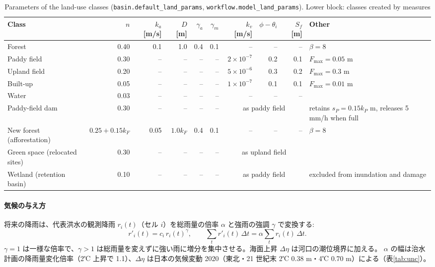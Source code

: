 \documentclass[a4paper,10pt]{ltjsarticle}
\begin{document}
\begin{table}[tbp]
\centering\footnotesize\setlength{\tabcolsep}{3pt}
\caption{Parameters of the land-use classes (\texttt{basin.default\_land\_params}, \texttt{workflow.model\_land\_params}). Lower block: classes created by measures}
\label{tab:landparams}
\begin{tabular}{@{}lrrrrrrrr>{\raggedright\arraybackslash}p{30mm}@{}}
\toprule
Class & $n$ & $k_a$ [m/s] & $D$ [m] & $\gamma_a$ & $\gamma_m$ & $k_v$ [m/s] & $\phi-\theta_i$ & $S_f$ [m] & Other \\
\midrule
Forest & 0.40 & 0.1 & 1.0 & 0.4 & 0.1 & -- & -- & -- & $\beta=8$ \\
Paddy field & 0.30 & -- & -- & -- & -- & $2\times10^{-7}$ & 0.2 & 0.1 & $F_{\max}=0.05$ m \\
Upland field & 0.20 & -- & -- & -- & -- & $5\times10^{-6}$ & 0.3 & 0.2 & $F_{\max}=0.3$ m \\
Built-up & 0.05 & -- & -- & -- & -- & $1\times10^{-7}$ & 0.1 & 0.1 & $F_{\max}=0.01$ m \\
Water & 0.03 & -- & -- & -- & -- & -- & -- & -- & \\
\midrule
Paddy-field dam & 0.30 & -- & -- & -- & -- & \multicolumn{3}{c}{as paddy field} & retains $s_P=0.15k_P$ m, releases 5 mm/h when full \\
New forest (afforestation) & $0.25+0.15k_F$ & 0.05 & $1.0k_F$ & 0.4 & 0.1 & -- & -- & -- & $\beta=8$ \\
Green space (relocated sites) & 0.30 & -- & -- & -- & -- & \multicolumn{3}{c}{as upland field} & \\
Wetland (retention basin) & 0.10 & -- & -- & -- & -- & \multicolumn{3}{c}{as paddy field} & excluded from inundation and damage \\
\bottomrule
\end{tabular}
\end{table}

\paragraph{気候の与え方}
将来の降雨は、代表洪水の観測降雨 $r_i(t)$（セル $i$）を総雨量の倍率 $\alpha$ と強雨の強調 $\gamma$ で変換する:
\begin{equation}
r'_i(t)=c_i\,r_i(t)^{\gamma},\qquad \textstyle\sum_t r'_i(t)\,\Delta t=\alpha\sum_t r_i(t)\,\Delta t .
\label{eq:rain}
\end{equation}
$\gamma=1$ は一様な倍率で、$\gamma>1$ は総雨量を変えずに強い雨に増分を集中させる。海面上昇 $\Delta\eta$ は河口の潮位境界に加える。
$\alpha$ の幅は治水計画の降雨量変化倍率（2℃ 上昇で 1.1）\cite{mlit_teigen}、$\Delta\eta$ は日本の気候変動 2020\cite{jma2020}（東北・21 世紀末 2℃ 0.38 m・4℃ 0.70 m）による（表\ref{tab:unc}）。
\end{document}

